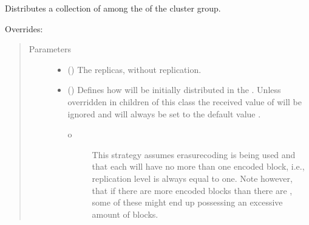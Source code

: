 \documentclass[letterpaper,10pt,english]{sphinxmanual}
\begin{document}
\begin{fulllineitems}
\begin{fulllineitems}
\label{\detokenize{app.domain:app.domain.cluster_groups.NewscastCluster.spread_files}}
Distributes a collection of {\hyperref[\detokenize{app.domain.helpers:app.domain.helpers.smart_dataclasses.FileBlockData}]{}} among the
 of the cluster group.
\begin{description}
\item[{Overrides:}] \leavevmode
{}

\end{description}
\begin{quote}\begin{description}
\item[{Parameters}] \leavevmode\begin{itemize}
\item {} 
 ({\hyperref[\detokenize{app:app.type_hints.ReplicasDict}]{}}) \textendash{} The {\hyperref[\detokenize{app.domain.helpers:app.domain.helpers.smart_dataclasses.FileBlockData}]{}}
replicas, without replication.

\item {} 
 () \textendash{} 
Defines how  will be initially distributed in
the . Unless overridden in children of this class the
received value of  will be ignored and will always
be set to the default value .
\begin{description}
\item[{o}] \leavevmode
This strategy assumes erasure\sphinxhyphen{}coding is being used and
that each {\hyperref[\detokenize{app.domain:app.domain.network_nodes.Node}]{}} will have no more than
one encoded block, i.e., replication level is always
equal to one. Note however, that if there are more encoded
blocks than there are {\hyperref[\detokenize{app.domain:app.domain.network_nodes.Node}]{}}, some of these 
might end up possessing an excessive amount of blocks.


\end{description}
\end{itemize}
\end{description}
\end{quote}
\end{fulllineitems}
\end{fulllineitems}
\end{document}
